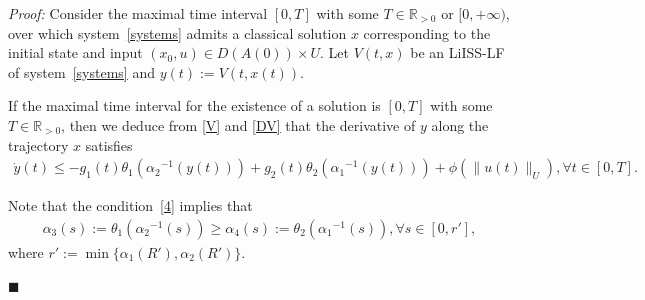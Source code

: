 \documentclass[onecolumn]{autart}
\newenvironment{proof}{{\it Proof:\enspace}}{\hfill $\blacksquare$\par}
\newenvironment{proof of Prop.ODE}{{\it Proof of Proposition~\ref{Prop.ODE}:\enspace}}{\hfill $\blacksquare$\par}
\newenvironment{proof of PDE}{{\it Proof of Proposition \ref{Prop.8}:\enspace}}{\hfill $\blacksquare$\par}
\begin{document}
{\begin{proof} 	
	Consider the      maximal time interval ${[0,T]}$ with some $T\in\mathbb{R}_{> 0}$ or $[0,+\infty)$, over which   system~\eqref{systems} admits a {classical} solution $x$ corresponding to the initial state and input  $(x_{0},u) \in  D(A(0)) \times U $. Let $V(t,x)$ be an LiISS-LF of system~\eqref{systems} and $y(t):=V(t, x(t))$.
	
	If the  maximal time interval for the existence of a solution is  ${[0,T]}$ with some $T\in\mathbb{R}_{> 0}$, then we deduce from \eqref{V} and \eqref{DV}   that the derivative of $y$ along the trajectory $x$ satisfies
	\begin{align}\label{18}
		\dot{y}(t)\leq-g_1(t)\theta_{1}\left({\alpha_{2}}^{-1}(y(t))\right)+g_2(t)\theta_{2}\left({\alpha_{1}}^{-1}(y(t))\right)+{\phi}\left({\|u(t)\|_{ U}}\right),\forall t\in[0,T].
	\end{align}
	
	Note that the condition~\eqref{4} implies that
	\begin{align*}
		\alpha_3(s):=\theta_{1}\left({\alpha_{2}}^{-1}(s)\right) \geq \alpha_4(s):=\theta_{2}\left({\alpha_{1}}^{-1}(s)\right),\forall s\in \left[0,r'\right],
	\end{align*}
	where $r':=\min\{\alpha_1(R'),\alpha_2(R')\}$.
	

\end{proof}}
\end{document}

